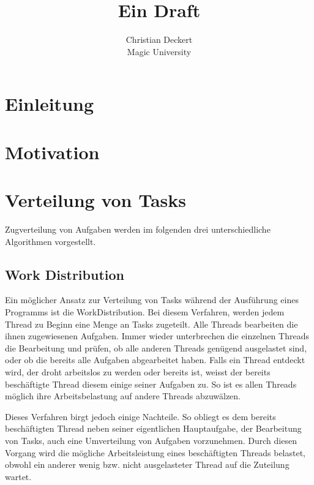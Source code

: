 \documentclass[12pt]{article}
\begin{document}



\title{Ein Draft}
\date{}
\author{Christian Deckert \\Magic University}
\maketitle
\newpage
\tableofcontents
\newpage
\setcounter{page}{1}


\section{Einleitung}

\section{Motivation}

\section{Verteilung von Tasks}

Zugverteilung von Aufgaben werden im folgenden drei unterschiedliche Algorithmen vorgestellt.


\subsection{Work Distribution}

Ein möglicher Ansatz zur Verteilung von Tasks während der Ausführung eines Programms ist die WorkDistribution. Bei diesem Verfahren, werden jedem Thread zu Beginn eine Menge an Tasks zugeteilt. Alle Threads bearbeiten die ihnen zugewiesenen Aufgaben. Immer wieder unterbrechen die einzelnen Threads die Bearbeitung und prüfen, ob alle anderen Threads genügend ausgelastet sind, oder ob die bereits alle Aufgaben abgearbeitet haben. Falls ein Thread entdeckt wird, der droht arbeitslos zu werden oder bereits ist, weisst der bereits beschäftigte Thread diesem einige seiner Aufgaben zu. So ist es allen Threads möglich ihre Arbeitsbelastung auf andere Threads abzuwälzen. 

Dieses Verfahren birgt jedoch einige Nachteile. So obliegt es dem bereits beschäftigten Thread neben seiner eigentlichen Hauptaufgabe, der Bearbeitung von Tasks, auch eine Umverteilung von Aufgaben vorzunehmen. Durch diesen Vorgang wird die mögliche Arbeitsleistung eines beschäftigten Threads belastet, obwohl ein anderer wenig bzw. nicht ausgelasteter Thread auf die Zuteilung wartet.
\end{document}
